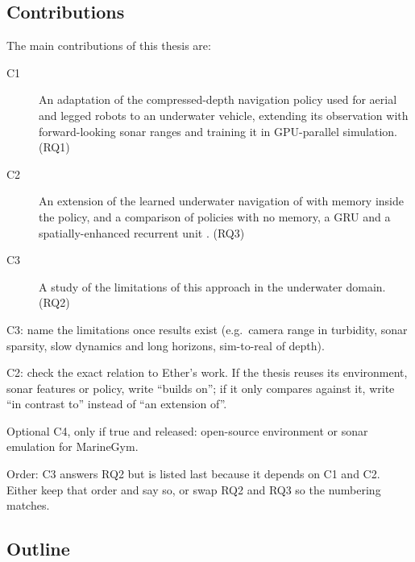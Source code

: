 \subsection{Contributions}
\label{sec:contributions}
The main contributions of this thesis are:
\begin{description}
    \item[C1] An adaptation of the compressed-depth navigation policy used for aerial and legged robots \parencite{kulkarni2024dce} to an underwater vehicle, extending its observation with forward-looking sonar ranges and training it in GPU-parallel simulation. (RQ1)
    \item[C2] An extension of the learned underwater navigation of \textcite{deowan2026unified} with memory inside the policy, and a comparison of policies with no memory, a GRU and a spatially-enhanced recurrent unit \parencite{yang2026spatially}. (RQ3)
    \item[C3] A study of the limitations of this approach in the underwater domain. (RQ2)
\end{description}
\begin{todolist}
  \item C3: name the limitations once results exist (e.g.\ camera range in turbidity, sonar sparsity, slow dynamics and long horizons, sim-to-real of depth).
  \item C2: check the exact relation to Ether's work. If the thesis reuses its environment, sonar features or policy, write ``builds on''; if it only compares against it, write ``in contrast to'' instead of ``an extension of''.
  \item Optional C4, only if true and released: open-source environment or sonar emulation for MarineGym.
  \item Order: C3 answers RQ2 but is listed last because it depends on C1 and C2. Either keep that order and say so, or swap RQ2 and RQ3 so the numbering matches.
\end{todolist}


\subsection{Outline}
